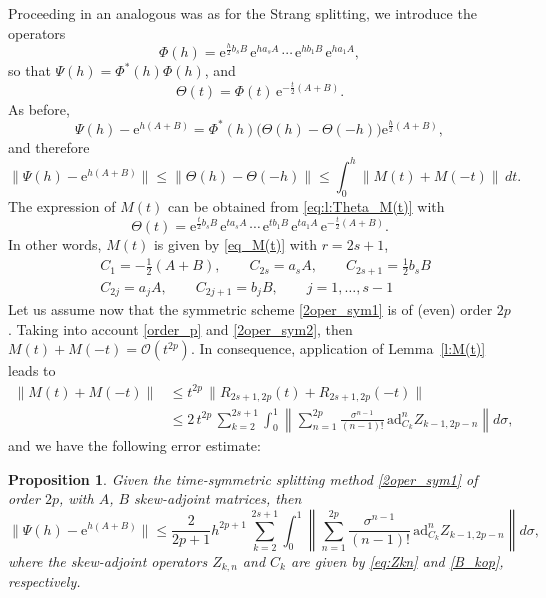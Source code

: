 \documentclass[11pt]{article}
\newcommand{\e}{\ensuremath{\mathrm{e}}}
\newcommand{\ad}{\ensuremath{\mathrm{ad}}}
\newtheorem{proposition}[lemma]{Proposition}
\begin{document}
Proceeding in an analogous was as for the Strang splitting, we introduce the operators
\[
  \Phi(h) = \e^{\frac{h}{2}  b_s B} \, \e^{h a_s A} \, \cdots \, \e^{h b_1 B} \, \e^{h a_1 A},
\]
so that  $\Psi(h) = \Phi^*(h) \Phi(h)$, and
\begin{equation} \label{2oper_sym2}
  \Theta(t) = \Phi(t) \, \e^{-\frac{t}{2} (A+B)}.
\end{equation}
As before,
\[
  \Psi(h) - \e^{h(A+B)} = \Phi^*(h) \big( \Theta(h) - \Theta(-h) \big) \e^{\frac{h}{2} (A+B)}, 
\]
and therefore
\begin{equation} \label{2oper_sym3}
   \| \Psi(h) - \e^{h(A+B)} \| \le \|\Theta(h) - \Theta(-h) \| \le \int_0^h \|M(t) + M(-t)\| \, dt.
\end{equation}   
The expression of $M(t)$ can be obtained from \eqref{eq:l:Theta_M(t)} with   
\begin{equation} \label{theta_2}
 \Theta(t) = \e^{ \frac{t}{2} b_s B} \, \e^{t a_s A} \, \cdots \, \e^{t b_1  B} \, \e^{t a_1 A} \, \e^{-\frac{t}{2} (A+B)}.
\end{equation}
%
In other words, $M(t)$ is given by \eqref{eq_M(t)} with $r=2s+1$,
\begin{equation} \label{B_kop}
\begin{aligned}
  & C_1 = -\frac{1}{2} (A+B), \qquad C_{2s} = a_s A, \qquad C_{2s+1} = \frac{1}{2} b_s B \\
  & C_{2j} = a_j A, \qquad C_{2j+1} = b_j B, \qquad j = 1, \ldots, s-1 
\end{aligned}  
\end{equation}
Let us assume now that the symmetric scheme \eqref{2oper_sym1} is of (even) order $2p$. Taking into account \eqref{order_p} and \eqref{2oper_sym2}, then
$M(t) + M(-t) = \mathcal{O}(t^{2p})$. In consequence, application of Lemma~\ref{l:M(t)} leads to 
\[
\begin{aligned}
  \|M(t) + M(-t)\| & \le t^{2p} \, \|R_{2s+1,2p}(t) + R_{2s+1,2p}(-t) \| \\
   & \le 2 \, t^{2p} \, \sum_{k=2}^{2s+1} \int_0^1 \left\|
 \sum_{n=1}^{2p} \frac{\sigma^{n-1}}{(n-1)!} \, \ad_{C_k}^n Z_{k-1,2p-n} 
\right\|
d\sigma,
\end{aligned}
\]
and we have the following error estimate:
\begin{proposition} \label{p:2operators}
Given the time-symmetric splitting method \eqref{2oper_sym1} of order $2p$, with $A$, $B$ skew-adjoint matrices, then
\[
\| \Psi(h) - \e^{h(A+B)} \| \leq \frac{2}{2p+1} h^{2p+1} \, \sum_{k=2}^{2s+1} \int_0^1
\left\|
 \sum_{n=1}^{2p} \frac{\sigma^{n-1}}{(n-1)!} \, \ad_{C_k}^n Z_{k-1,2p-n} 
\right\|
d\sigma,
\]
where the skew-adjoint operators $Z_{k,n}$ and $C_k$ are given by \eqref{eq:Zkn} and \eqref{B_kop}, respectively.
\end{proposition}
\end{document}
